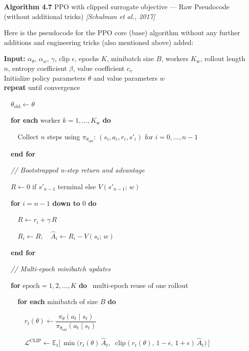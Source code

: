 \documentclass[11pt]{article}
\begin{document}
    \begin{pseudobox}

\textbf{Algorithm 4.7} PPO with clipped surrogate objective --- Raw
Pseudocode (without additional tricks) \emph{{[}Schulman et al.,
2017{]}}

\tcbline

Here is the pseudocode for the PPO core (base) algorithm without any
further additions and engineering tricks (also mentioned above) added:

\textbf{Input:} \(\alpha_\theta\), \(\alpha_w\), \(\gamma\), clip
\(\epsilon\), epochs \(K\), minibatch size \(B\), workers
\(K_{\text{w}}\), rollout length \(n\), entropy coefficient \(\beta\),
value coefficient \(c_v\)\\
Initialize policy parameters \(\theta\) and value parameters \(w\)\\
\textbf{repeat} until convergence\\
\strut ~~\(\theta_{\text{old}} \leftarrow \theta\)\\
\strut ~~\textbf{for each} worker \(k = 1, \ldots, K_{\text{w}}\)
\textbf{do}\\
\strut ~~~~Collect \(n\) steps using \(\pi_{\theta_{\text{old}}}\):
\((s_i, a_i, r_i, s'_i)\) for \(i = 0, \ldots, n - 1\)\\
\strut ~~\textbf{end for}\\
\strut ~~\emph{// Bootstrapped n-step return and advantage}\\
\strut ~~\(R \leftarrow 0\) if \(s'_{n-1}\) terminal else
\(V(s'_{n-1};\, w)\)\\
\strut ~~\textbf{for} \(i = n - 1\) \textbf{down to} \(0\) \textbf{do}\\
\strut ~~~~\(R \leftarrow r_i + \gamma\, R\)\\
\strut ~~~~\(R_i \leftarrow R;\quad \hat{A}_i \leftarrow R_i - V(s_i;\, w)\)\\
\strut ~~\textbf{end for}\\
\strut ~~\emph{// Multi-epoch minibatch updates}\\
\strut ~~\textbf{for} \(\text{epoch} = 1, 2, \ldots, K\) \textbf{do}
~multi-epoch reuse of one rollout\\
\strut ~~~~\textbf{for each} minibatch of size \(B\) \textbf{do}\\
\strut ~~~~~~\(r_t(\theta) \leftarrow \dfrac{\pi_\theta(a_t \mid s_t)}{\pi_{\theta_{\text{old}}}(a_t \mid s_t)}\)\\
\strut ~~~~~~\(\mathcal{L}^{\text{CLIP}} \leftarrow \mathbb{E}_t\!\bigl[\, \min\!\bigl(r_t(\theta)\, \hat{A}_t,\;\; \mathrm{clip}(r_t(\theta),\, 1 - \epsilon,\, 1 + \epsilon)\, \hat{A}_t\bigr) \,\bigr]\)\\

\end{pseudobox}
\end{document}
